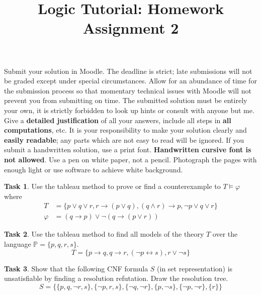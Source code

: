 \documentclass[a4paper]{amsart}
\title{\sc Logic Tutorial: Homework Assignment 2}
\theoremstyle{definition}
\newtheorem{task}{Task}
\begin{document}
\maketitle

\thispagestyle{empty}
\vspace{-0.5cm}

Submit your solution in Moodle. The deadline is strict; late submissions will not be graded except under special circumstances. Allow for an abundance of time for the submission process so that momentary technical issues with Moodle will not prevent you from submitting on time. The submitted solution must be entirely your own, it is strictly forbidden to look up hints or consult with anyone but me. Give a \textbf{detailed justification} of all your answers, include all steps in \textbf{all computations}, etc. It is your responsibility to make your solution clearly and \textbf{easily readable}; any parts which are not easy to read will be ignored. If you submit a handwritten solution, use a print font. \textbf{Handwritten cursive font is not allowed}. Use a pen on white paper, not a pencil. Photograph the pages with enough light or use software to achieve white background.

\bigskip

\begin{task}
Use the tableau method to prove or find a counterexample to $T\models\varphi$ where
\begin{align*}
T&=\{ p \vee q \vee r, r \to (p \vee q), (q \wedge r) \to p, \neg p \vee q \vee r \}\\
\varphi&=(q \to p) \vee \neg (q \to (p\vee r))
\end{align*}
\end{task}

\bigskip

\begin{task}
Use the tableau method to find all models of the theory $T$ over the language $\mathbb P=\{p,q,r,s\}$.
$$T=\{p \to q, q \to r, (\neg p \leftrightarrow s), r\vee\neg s\}$$ 
\end{task}

\bigskip


\begin{task}
Show that the following CNF formula $S$ (in set representation) is unsatisfiable by finding a resolution refutation. Draw the resolution tree.
$$
S=\{\{p,q, \neg r,s\}, \{\neg p,r,s\}, \{\neg q, \neg r\}, \{p, \neg s\}, \{\neg p, \neg r\}, \{r\}\}
$$
\end{task}
\end{document}
